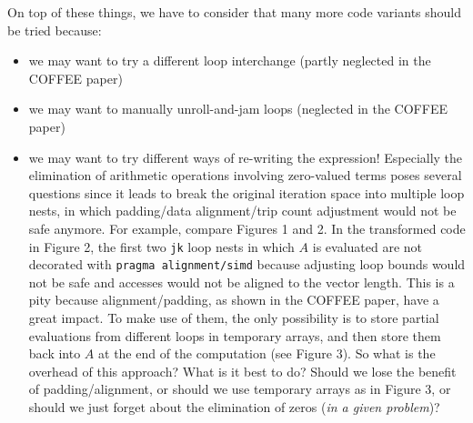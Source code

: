 \documentclass[a4paper]{article}
\begin{document}
\begin{itemize}
On top of these things, we have to consider that many more code variants should be tried because: 
\begin{itemize}
\item we may want to try a different loop interchange (partly neglected in the COFFEE paper)
\item we may want to manually unroll-and-jam loops (neglected in the COFFEE paper)
\item we may want to try different ways of re-writing the expression! Especially the elimination of arithmetic operations involving zero-valued terms poses several questions since it leads to break the original iteration space into multiple loop nests, in which padding/data alignment/trip count adjustment would not be safe anymore. For example, compare Figures 1 and 2. In the transformed code in Figure 2, the first two \texttt{jk} loop nests in which $A$ is evaluated are not decorated with \texttt{pragma alignment/simd} because adjusting loop bounds would not be safe and accesses would not be aligned to the vector length. This is a pity because alignment/padding, as shown in the COFFEE paper, have a great impact. To make use of them, the only possibility is to store partial evaluations from different loops in temporary arrays, and then store them back into $A$ at the end of the computation (see Figure 3). So what is the overhead of this approach? What is it best to do? Should we lose the benefit of padding/alignment, or should we use temporary arrays as in Figure 3, or should we just forget about the elimination of zeros (\textit{in a given problem})? 
\end{itemize}


\end{itemize}
\end{document}
